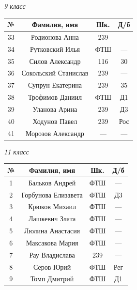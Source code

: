 \documentclass[12pt]{article}
\newlength{\h}
\newlength{\x}
\begin{document}
\begin{table}[ht]
  \begin{minipage}[t]{0.48\linewidth}\centering
    \begin{center}
      \textit{9 класс}
    \end{center}
    \begin{tabular}[h]{|c|c|c|c|}
      \hline
      \textbf{№} & \textbf{Фамилия, имя} & \textbf{Шк.} & \textbf{Д/б}\\
      \hline
      33 & Родионова Анна & 239 & ---  \\ \hline
      34 & Рутковский Илья & ФТШ & ---  \\ \hline
      35 & Силов Александр & 116 & 30  \\ \hline
      36 & Сокольский Станислав & 239 & ---  \\ \hline
      37 & Супрун Екатерина & 239 & 35  \\ \hline
      38 & Трофимов Даниил & ФТШ & Д1  \\ \hline
      39 & Уланова Арина & 239 & Д3  \\ \hline
      40 & Ходунов Павел & 239 & Рос  \\ \hline
      41 & Морозов Александр & --- & ---  \\ \hline
    \end{tabular}
    \begin{center}
      \textit{11 класс}
    \end{center}
    \begin{tabular}[h]{|c|c|c|c|}
      \hline
      \textbf{№} & \textbf{Фамилия, имя} & \textbf{Шк.} & \textbf{Д/б}\\
      \hline
      1 & Бальков Андрей & ФТШ & ---  \\ \hline
      2 & Горбунова Елизавета & ФТШ & Д3  \\ \hline
      3 & Крюков Михаил & ФТШ & ---  \\ \hline
      4 & Лашкевич Злата & ФТШ & ---  \\ \hline
      5 & Люлина Анастасия & ФТШ & ---  \\ \hline
      6 & Максакова Мария & ФТШ & ---  \\ \hline
      7 & Рау Владислава & 239 & ---  \\ \hline
      8 & Серов Юрий & ФТШ & Рег  \\ \hline
      9 & Томп Дмитрий & ФТШ & Д1  \\ \hline
    \end{tabular}
  \end{minipage}

\end{table}
\end{document}
